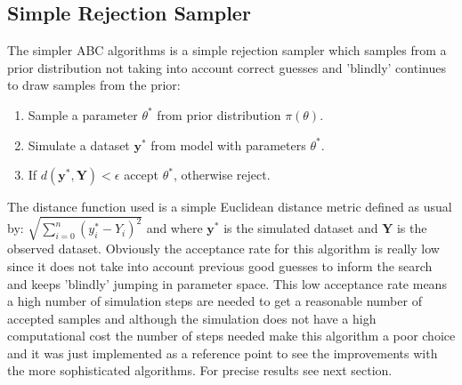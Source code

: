 \documentclass[12pt,a4paper,titlepage]{article}
\begin{document}
\subsection{Simple Rejection Sampler}
The simpler ABC algorithms is a simple rejection sampler\cite{pritchard1999population} which samples from a prior distribution not taking into account correct guesses and 'blindly' continues to draw samples from the prior:
\begin{enumerate}[noitemsep]
\item{Sample a parameter $\theta ^*$ from prior distribution $\pi(\theta)$.}
\item{Simulate a dataset $\mathbf{y}^*$  from model with parameters $\theta ^*$.}
\item{If $d(\mathbf{y}^*, \mathbf{Y}) < \epsilon$ accept $\theta^*$, otherwise reject.}
\end{enumerate}
The distance function used is a simple Euclidean distance metric defined as usual by: $\sqrt{\sum_{i=0}^{n} (y^*_{i} - Y_{i})^2}$ and where $\mathbf{y}^*$ is the simulated dataset and $\mathbf{Y}$ is the observed dataset. Obviously the acceptance rate for this algorithm is really low since it does not take into account previous good guesses to inform the search and keeps 'blindly' jumping in parameter space. This low acceptance rate means a high number of simulation steps are needed to get a reasonable number of accepted samples and although the simulation does not have a high computational cost the number of steps needed make this algorithm a poor choice and it was just implemented as a reference point to see the improvements with the more sophisticated algorithms. For precise results see next section.
\end{document}
